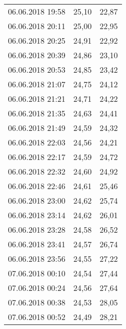 \documentclass[a4paper,11pt,twoside]{article}
\begin{document}
\begin{longtable}[c]{ccc}
06.06.2018 19:58       & 25,10                & 22,87                          \\
06.06.2018 20:11       & 25,00                & 22,95                          \\
06.06.2018 20:25       & 24,91                & 22,92                          \\
06.06.2018 20:39       & 24,86                & 23,10                          \\
06.06.2018 20:53       & 24,85                & 23,42                          \\
06.06.2018 21:07       & 24,75                & 24,12                          \\
06.06.2018 21:21       & 24,71                & 24,22                          \\
06.06.2018 21:35       & 24,63                & 24,41                          \\
06.06.2018 21:49       & 24,59                & 24,32                          \\
06.06.2018 22:03       & 24,56                & 24,21                          \\
06.06.2018 22:17       & 24,59                & 24,72                          \\
06.06.2018 22:32       & 24,60                & 24,92                          \\
06.06.2018 22:46       & 24,61                & 25,46                          \\
06.06.2018 23:00       & 24,62                & 25,74                          \\
06.06.2018 23:14       & 24,62                & 26,01                          \\
06.06.2018 23:28       & 24,58                & 26,52                          \\
06.06.2018 23:41       & 24,57                & 26,74                          \\
06.06.2018 23:56       & 24,55                & 27,22                          \\
07.06.2018 00:10       & 24,54                & 27,44                          \\
07.06.2018 00:24       & 24,56                & 27,64                          \\
07.06.2018 00:38       & 24,53                & 28,05                          \\
07.06.2018 00:52       & 24,49                & 28,21                          \\

\end{longtable}
\end{document}
